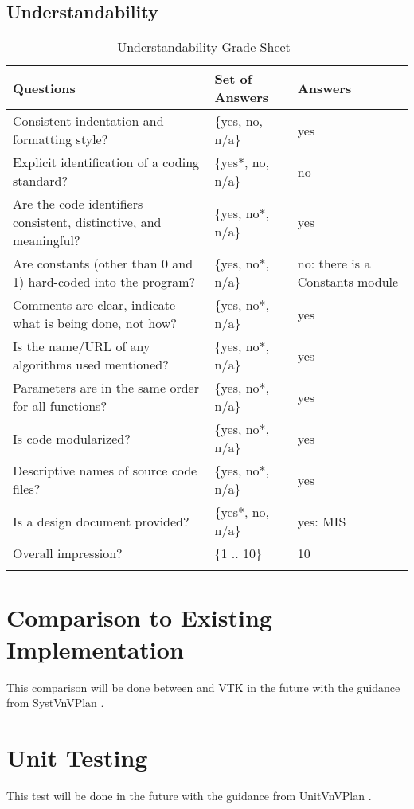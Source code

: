 \documentclass[12pt, titlepage]{article}
\begin{document}
\subsection{Understandability}
\label{sec_Understandability}

\begin{longtable}{p{7cm} p{3cm} p{5cm}}
\toprule
Questions & Set of Answers & Answers\\ \midrule
Consistent indentation and formatting style? & \{yes, no, n/a\} & yes\\
Explicit identification of a coding standard? & \{yes*, no, n/a\} & no\\
Are the code identifiers consistent, distinctive, and meaningful? & \{yes, no*,
n/a\} & yes\\
Are constants (other than 0 and 1) hard-coded into the program? & \{yes, no*,
n/a\} & no: there is a Constants module\\
Comments are clear, indicate what is being done, not how? & \{yes, no*, n/a\} &
yes
\\Is the name/URL of any algorithms used mentioned? & \{yes, no*, n/a\} & yes\\
Parameters are in the same order for all functions? & \{yes, no*, n/a\} & yes\\
Is code modularized? & \{yes, no*, n/a\} & yes\\
Descriptive names of source code files? & \{yes, no*, n/a\} & yes\\
Is a design document provided? & \{yes*, no, n/a\} & yes: MIS
\cite{Dong2019MIS}\\
Overall impression? & \{1 .. 10\} & 10\\ \bottomrule
\caption{Understandability Grade Sheet~\cite{SmithEtAl2018}}
\label{Tb_understandability}
\end{longtable}

\section{Comparison to Existing Implementation}	

This comparison will be done between \progname{} and VTK in the future with the
guidance from SystVnVPlan \cite{Dong2019SystVnV}.

\section{Unit Testing}

This test will be done in the future with the guidance from UnitVnVPlan
\cite{Dong2019UnitVnV}.
\end{document}
